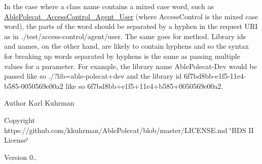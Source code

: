 In the case where a class name contains a mixed case word, such as \hyperlink{class_able_polecat___access_control___agent___user}{Able\+Polecat\+\_\+\+Access\+Control\+\_\+\+Agent\+\_\+\+User} (where \textquotesingle{}Access\+Control\textquotesingle{} is the mixed case word), the parts of the word should be separated by a hyphen in the request U\+R\+I as in ./test/access-\/control/agent/user. The same goes for method. Library ids and names, on the other hand, are likely to contain hyphens and so the syntax for breaking up words separated by hyphens is the same as passing multiple values for a parameter. For example, the library name Able\+Polecat-\/\+Dev would be passed like so ./?lib=able-\/polecat+dev and the library id 6f7bd8bb-\/e1f5-\/11e4-\/b585-\/0050569e00a2 like so 6f7bd8bb+e1f5+11e4+b585+0050569e00a2.

\begin{DoxyAuthor}{Author}
Karl Kuhrman 
\end{DoxyAuthor}
\begin{DoxyCopyright}{Copyright}
https\+://github.com/kkuhrman/\+Able\+Polecat/blob/master/\+L\+I\+C\+E\+N\+S\+E.\+md \char`\"{}\+B\+D\+S I\+I License\char`\"{} 
\end{DoxyCopyright}
\begin{DoxyVersion}{Version}
0.. 
\end{DoxyVersion}

